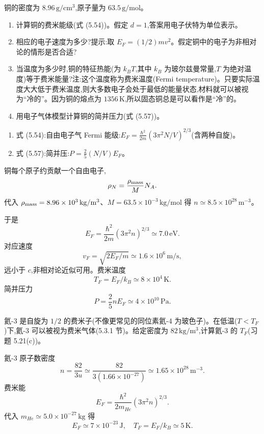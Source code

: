 \begin{question}
铜的密度为 $8.96\,\mathrm{g/cm^3}$,原子量为 $63.5\,\mathrm{g/mol}$。
\begin{enumerate}
\item 计算铜的费米能级(式 (5.54))。假定 $d=1$,答案用电子伏特为单位表示。
\item 相应的电子速度为多少?提示:取 $E_F=(1/2)mv^2$。假定铜中的电子为非相对论的情形是否合适?
\item 当温度为多少时,铜的特征热能(为 $k_B T$,其中 $k_B$ 为玻尔兹曼常量,$T$ 为绝对温度)等于费米能量?注:这个温度称为费米温度(Fermi temperature)。只要实际温度大大低于费米温度,则大多数电子会处于最低的能量状态,材料就可以被视为“冷的”。因为铜的熔点为 $1356\,\mathrm K$,所以固态铜总是可以看作是“冷”的。
\item 用电子气体模型计算铜的简并压力(式 (5.57))。
\end{enumerate}

\par\smallskip
{}
\begin{enumerate}[leftmargin=2.2em,itemsep=0.12em,topsep=0.12em,parsep=0pt]
\item 式 (5.54):自由电子气 Fermi 能级:$E_F=\frac{\hbar^2}{2m}(3\pi^2N/V)^{2/3}$(含两种自旋)。
\item 式 (5.57):简并压:$P=\frac25(N/V)E_F$。
\end{enumerate}

\end{question}
\begin{solution}

铜每个原子约贡献一个自由电子,
\[
\rho_N=\frac{\rho_{\rm mass}}{M}N_A.
\]
代入 $\rho_{\rm mass}=8.96\times10^3\,\mathrm{kg/m^3}$、$M=63.5\times10^{-3}\,\mathrm{kg/mol}$ 得 $n\simeq8.5\times10^{28}\,\mathrm{m^{-3}}$。

于是
\[
E_F=\frac{\hbar^2}{2m}(3\pi^2n)^{2/3}\simeq7.0\,\mathrm{eV}.
\]
对应速度
\[
v_F=\sqrt{2E_F/m}\simeq1.6\times10^6\,\mathrm{m/s},
\]
远小于 $c$,非相对论近似可用。费米温度
\[
T_F=E_F/k_B\simeq8\times10^4\,\mathrm K.
\]
简并压力
\[
P=\frac25nE_F\simeq4\times10^{10}\,\mathrm{Pa}.
\]

\end{solution}

\begin{question}
氦-3 是自旋为 $1/2$ 的费米子(不像更常见的同位素氦-4 为玻色子)。在低温($T<T_F$)下,氦-3 可以被视为费米气体(5.3.1 节)。给定密度为 $82\,\mathrm{kg/m^3}$,计算氦-3 的 $T_F$(习题 5.21(c))。
\end{question}
\begin{solution}

氦-3 原子数密度
\[
n=\frac{82}{3u}\simeq\frac{82}{3(1.66\times10^{-27})}\simeq1.65\times10^{28}\,\mathrm{m^{-3}}.
\]
费米能
\[
E_F=\frac{\hbar^2}{2m_{He}}(3\pi^2n)^{2/3}.
\]
代入 $m_{He}\simeq5.0\times10^{-27}\,\mathrm{kg}$ 得
\[
E_F\simeq7\times10^{-23}\,\mathrm J,
\quad
T_F=E_F/k_B\simeq5\,\mathrm K.
\]

\end{solution}

